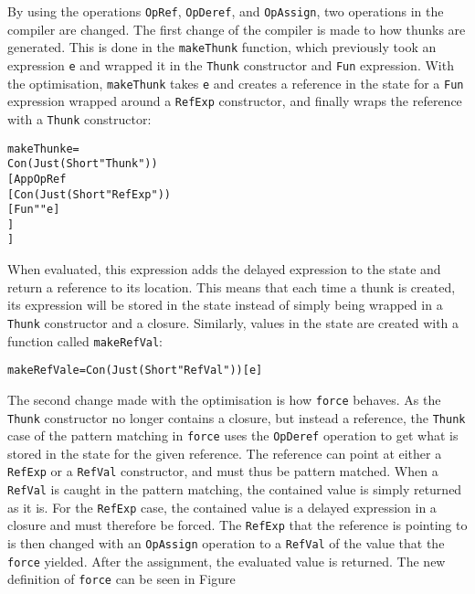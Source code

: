 By using the operations \texttt{OpRef}, \texttt{OpDeref}, and \texttt{OpAssign},
two operations in the compiler are changed. The first change of the compiler
is made to how thunks are generated. This is done in the
\texttt{makeThunk} function, which previously took an expression \texttt{e} and
wrapped it in the \texttt{Thunk} constructor and \texttt{Fun} expression. With
the optimisation, \texttt{makeThunk}
takes \texttt{e} and creates a reference in the state for a \texttt{Fun}
expression wrapped around a \texttt{RefExp} constructor, and finally wraps
the reference with a \texttt{Thunk} constructor:
\begin{alltt}
  makeThunk e =
    Con (Just (Short "Thunk"))
      [App OpRef
        [Con (Just (Short "RefExp"))
          [Fun "" e]
        ]
      ]
\end{alltt}
When evaluated, this expression adds the delayed expression to the state and
return a reference to its location. This means that each time a thunk is
created, its expression will be stored in the state instead of simply being wrapped in a
\texttt{Thunk} constructor and a closure. Similarly, values in the state are
created with a function called \texttt{makeRefVal}:
\begin{alltt}
  makeRefVal e = Con (Just (Short "RefVal")) [e]
\end{alltt}

The second change made with the optimisation is how \texttt{force}
behaves. As the \texttt{Thunk} constructor no longer contains a closure, but
instead a reference, the \texttt{Thunk} case of the pattern matching in
\texttt{force} uses the \texttt{OpDeref} operation to get what is stored in
the state for the given reference. The reference can point at either a
\texttt{RefExp} or a \texttt{RefVal} constructor, and must thus be pattern
matched. When a \texttt{RefVal} is caught in the pattern matching, the contained
value is simply returned as it is. For the \texttt{RefExp} case, the contained
value is a delayed expression in a closure and must therefore be forced.
The \texttt{RefExp} that the reference is pointing to is then changed with an
\texttt{OpAssign} operation to a \texttt{RefVal} of the value that the
\texttt{force} yielded. After the assignment, the evaluated value is returned.
The new definition of \texttt{force} can be seen in Figure

